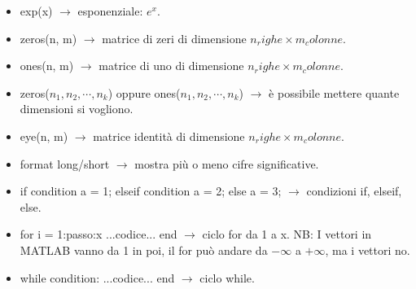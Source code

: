 \begin{itemize}
    \item exp(x) $\rightarrow$ esponenziale: $e^x$.
    \item zeros(n, m) $\rightarrow$ matrice di zeri di dimensione $n_righe \times m_colonne$.
    \item ones(n, m) $\rightarrow$ matrice di uno di dimensione $n_righe \times m_colonne$.
    \item zeros($n_1,n_2, \cdots, n_k$) oppure ones($n_1,n_2, \cdots, n_k$) $\rightarrow$ è possibile mettere quante dimensioni si vogliono.
    \item eye(n, m) $\rightarrow$ matrice identità di dimensione $n_righe \times m_colonne$.
    \item format long/short $\rightarrow$ mostra più o meno cifre significative.
    \newpage
    \item if condition
        \newline
        a = 1;
        \newline
        elseif condition
        \newline
        a = 2;
        \newline
        else
        \newline
        a = 3; $\rightarrow$ condizioni if, elseif, else.
    \item for i = 1:passo:x
        \newline
        ...codice...
        \newline
        end $\rightarrow$ ciclo for da 1 a x. NB: I vettori in MATLAB vanno da 1 in poi, il for può andare da $-\infty$ a $+\infty$, ma i vettori no.   
    \item while condition:
        \newline
        ...codice...
        \newline
        end $\rightarrow$ ciclo while.
\end{itemize} 
